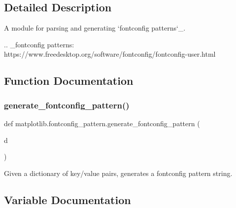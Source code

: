 \subsection{Detailed Description}
\begin{DoxyVerb}A module for parsing and generating `fontconfig patterns`_.

.. _fontconfig patterns:
   https://www.freedesktop.org/software/fontconfig/fontconfig-user.html
\end{DoxyVerb}
 

\subsection{Function Documentation}
\mbox{\label{namespacematplotlib_1_1fontconfig__pattern_a5cdabe2597ceb298395ca891b2ee7935}} 
\subsubsection{\texorpdfstring{generate\+\_\+fontconfig\+\_\+pattern()}{generate\_fontconfig\_pattern()}}
{\footnotesize\ttfamily def matplotlib.\+fontconfig\+\_\+pattern.\+generate\+\_\+fontconfig\+\_\+pattern (\begin{DoxyParamCaption}\item[{}]{d }\end{DoxyParamCaption})}

\begin{DoxyVerb}Given a dictionary of key/value pairs, generates a fontconfig
pattern string.
\end{DoxyVerb}
 

\subsection{Variable Documentation}
\mbox{\label{namespacematplotlib_1_1fontconfig__pattern_a32b2f305eb822794bd2b538b6a4b8c88}} 
